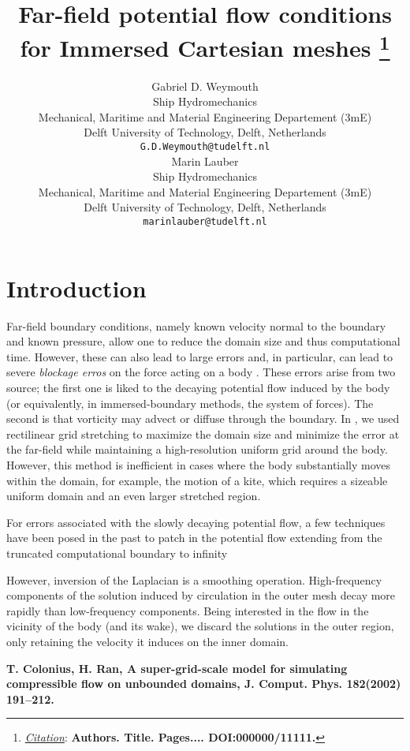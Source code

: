 \documentclass{article}
\title{Far-field potential flow conditions for Immersed Cartesian meshes
\thanks{\textit{\underline{Citation}}: 
\textbf{Authors. Title. Pages.... DOI:000000/11111.}} 
}
\author{
    Gabriel D. Weymouth\\
    Ship Hydromechanics\\
    Mechanical, Maritime and Material Engineering Departement (3mE) \\
    Delft University of Technology, Delft, Netherlands \\
    \texttt{G.D.Weymouth@tudelft.nl} \\
    \AND
    Marin Lauber\\
    Ship Hydromechanics\\
    Mechanical, Maritime and Material Engineering Departement (3mE) \\
    Delft University of Technology, Delft, Netherlands \\
    \texttt{marinlauber@tudelft.nl} \\
}
\begin{document}
\maketitle


\begin{abstract}
\lipsum[1]
\end{abstract}




\section{Introduction}

Far-field boundary conditions, namely known velocity normal to the boundary and known pressure, allow one to reduce the domain size and thus computational time. However, these can also lead to large errors and, in particular, can lead to severe \emph{blockage erros} on the force acting on a body \cite{Colonius2008}. These errors arise from two source; the first one is liked to the decaying potential flow induced by the body (or equivalently, in immersed-boundary methods, the system of forces). The second is that vorticity may advect or diffuse through the boundary. In \cite{Maertens2015, Lauber2022}, we used rectilinear grid stretching to maximize the domain size and minimize the error at the far-field while maintaining a high-resolution uniform grid around the body. However, this method is inefficient in cases where the body substantially moves within the domain, for example, the motion of a kite, which requires a sizeable uniform domain and an even larger stretched region. 


For errors associated with the slowly decaying potential flow, a few techniques have been posed in the past to patch in the potential flow extending from the truncated computational boundary to infinity \cite{Colonius2008}

However, inversion of the Laplacian is a smoothing operation. High-frequency components of the solution induced by circulation in the outer mesh decay more rapidly than low-frequency components. Being interested in the flow in the vicinity of the body (and its wake), we discard the solutions in the outer region, only retaining the velocity it induces on the inner domain.

\textbf{T. Colonius, H. Ran, A super-grid-scale model for simulating compressible flow on unbounded domains, J. Comput. Phys. 182(2002) 191–212.}
\end{document}
